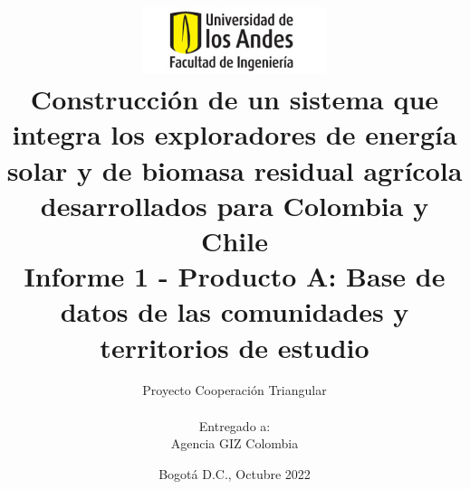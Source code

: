 \hypersetup{pageanchor=false}
\title{
    \centering
    \includegraphics[width=0.4\textwidth]{figures/logo}\\
    \vspace{1cm}
    Construcción de un sistema que integra los exploradores de energía solar y de biomasa residual agrícola desarrollados para Colombia y Chile\\
    \vspace{1cm}
    \large Informe 1 - Producto A: Base de datos de las comunidades y territorios de estudio
}   
\author{
    Proyecto Cooperación Triangular \\
    \vspace{5mm}\\
    Entregado a:\\ \large Agencia GIZ Colombia
}
\date{\vspace{2cm}Bogotá D.C., Octubre 2022}
\maketitle
\hypersetup{pageanchor=true}

\tableofcontents
